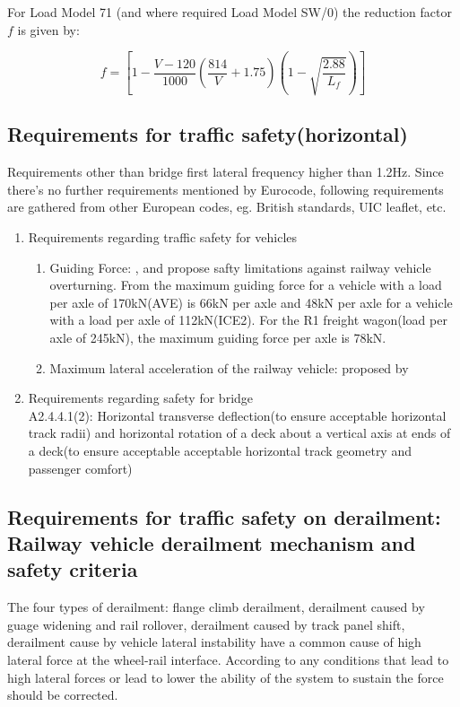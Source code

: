 For Load Model 71 (and where required Load Model SW/0) the reduction factor $f$ is given by:

\begin{equation}
	f=[1-\frac{V-120}{1000}(\frac{814}{V}+1.75)(1-\sqrt{\frac{2.88}{L_f}})]
\end{equation}

\subsection{Requirements for traffic safety(horizontal)}
Requirements other than bridge first lateral frequency higher than 1.2Hz. Since there's no further requirements mentioned by Eurocode, following requirements are gathered from other European codes, eg. British standards, UIC leaflet, etc.

\begin{enumerate}[-]
	\item Requirements regarding traffic safety for vehicles
	\begin{enumerate}
		\item Guiding Force: \cite{code2005518} , \cite{en200714363} and\cite{cuadrado2008analysis} propose safty limitations against railway vehicle overturning. From\cite{en200714363} the maximum guiding force for a vehicle with a load per axle of 170kN(AVE) is 66kN per axle and 48kN per axle for a vehicle with a load per axle of 112kN(ICE2). For the R1 freight wagon(load per axle of 245kN), the maximum guiding force per axle is 78kN.
		\item Maximum lateral acceleration of the railway vehicle: proposed by \cite{13803}
	\end{enumerate}
	\item Requirements regarding safety for bridge\\
	\cite{EC0} A2.4.4.1(2): Horizontal transverse deflection(to ensure acceptable horizontal track radii) and horizontal rotation of a deck about a vertical axis at ends of a deck(to ensure acceptable acceptable horizontal track geometry and passenger comfort)
\end{enumerate}

\subsection{Requirements for traffic safety on derailment: Railway vehicle derailment mechanism and safety criteria}
The four types of derailment: flange climb derailment, derailment caused by guage widening and rail rollover, derailment caused by track panel shift, derailment cause by vehicle lateral instability have a common cause of high lateral force at the wheel-rail interface. According to \cite[Chapter 8, IV]{iwnicki2006handbook} any conditions that lead to high lateral forces or lead to lower the ability of the system to sustain the force should be corrected. 

